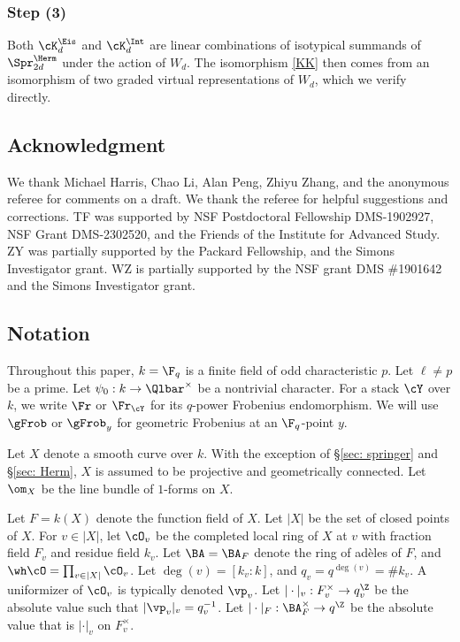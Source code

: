 \subsubsection{Step (3)} Both $\cK^{\Eis}_{d}$ and $\cK^{\Int}_{d}$ are linear combinations of isotypical summands of $\Spr^{\Herm}_{2d}$ under the action of $W_{d}$. The isomorphism \eqref{KK} then comes from an isomorphism of two graded virtual representations of $W_{d}$, which we verify directly.


\subsection*{Acknowledgment}

We thank Michael Harris, Chao Li, Alan Peng, Zhiyu Zhang, and the anonymous referee for comments on a draft. We thank the referee for helpful suggestions and corrections. TF was supported by NSF Postdoctoral Fellowship DMS-1902927, NSF Grant DMS-2302520, and the Friends of the Institute for Advanced Study.  ZY was partially supported by the Packard Fellowship, and the Simons Investigator grant. WZ is partially supported by the NSF grant DMS \#1901642  and the Simons Investigator grant.


\subsection{Notation}\label{ssec: notation}

Throughout this paper, $k=\F_{q}$ is a finite field of odd characteristic $p$. Let $\ell\ne p$ be a prime.   Let $\psi_{0}: k\to\Qlbar^{\times}$ be a nontrivial character. For a stack $\cY$ over $k$, we write $\Fr$ or $\Fr_{\cY}$ for its $q$-power Frobenius endomorphism. We will use $\gFrob$ or $\gFrob_{y}$ for geometric Frobenius at an $\F_{q}$-point $y$.

Let $X$ denote a smooth curve over $k$. With the exception of \S\ref{sec: springer} and \S\ref{sec: Herm}, $X$ is assumed to be projective and geometrically connected. Let $\om_{X}$ be the line bundle of $1$-forms on $X$.

Let $F=k(X)$ denote the function field of $X$.  Let $|X|$ be the set of closed points of $X$. For $v\in |X|$, let $\cO_{v}$ be the completed local ring of $X$ at $v$ with fraction field $F_{v}$ and residue field $k_{v}$.   Let $\BA=\BA_{F}$ denote the ring of ad\`eles of $F$, and $\wh\cO=\prod_{v\in |X|}\cO_{v}$. Let $\deg(v)=[k_{v}:k]$, and $q_{v}=q^{\deg(v)}=\#k_{v}$. A uniformizer of $\cO_{v}$ is typically denoted $\vp_{v}$. Let $|\cdot|_{v}: F^{\times}_{v}\to q^{\Z}_{v}$ be the absolute value such that  $|\vp_{v}|_{v}=q^{-1}_{v}$. Let $|\cdot|_{F}: \BA_{F}^{\times}\to q^{\Z}$ be the absolute value that is $|\cdot|_{v}$ on $F_{v}^{\times}$.

